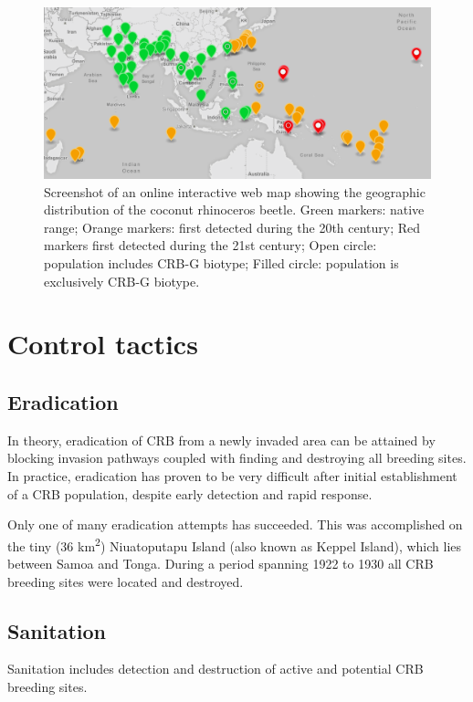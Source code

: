 \documentclass[twocolumn,letterpaper]{scrartcl}
\begin{document}
\begin{figure}[h!]
	\centering
	\includegraphics[width=\linewidth]{images/crb_dist}
	\caption{Screenshot of an online interactive web map showing the geographic distribution of the coconut rhinoceros beetle. Green markers: native range; Orange markers: first detected during the 20th century; Red markers first detected during the 21st century; Open circle: population includes CRB-G biotype; Filled circle: population is exclusively CRB-G biotype.}
	\label{fig:crbdist}
\end{figure}

\section{Control tactics}

\subsection{Eradication}

In theory, eradication of CRB from a newly invaded area can be attained by blocking invasion pathways coupled with finding and destroying all breeding sites. In practice, eradication has proven to be very difficult after initial establishment of a CRB population, despite early detection and rapid response. 

Only one of many eradication attempts has succeeded. This was accomplished on the tiny (36 km\textsuperscript{2}) Niuatoputapu Island (also known as Keppel Island), which lies between Samoa and Tonga. During a period spanning 1922 to 1930 all CRB breeding sites were located and destroyed.

\subsection{Sanitation}

Sanitation includes detection and destruction of active and potential CRB breeding sites.
\end{document}
